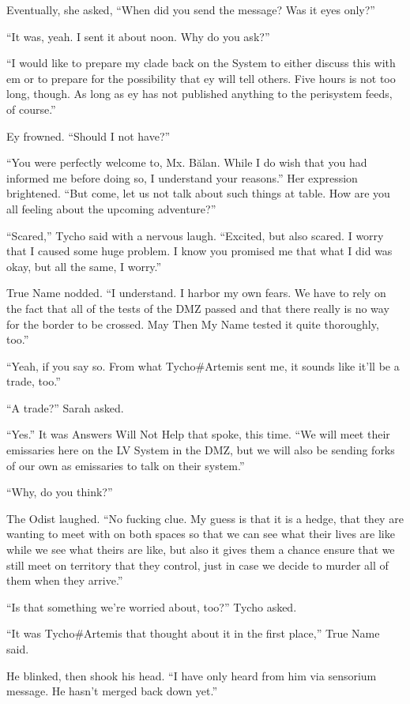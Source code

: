 Eventually, she asked, ``When did you send the message? Was it eyes only?''

``It was, yeah. I sent it about noon. Why do you ask?''

``I would like to prepare my clade back on the System to either discuss this with em or to prepare for the possibility that ey will tell others. Five hours is not too long, though. As long as ey has not published anything to the perisystem feeds, of course.''

Ey frowned. ``Should I not have?''

``You were perfectly welcome to, Mx. Bălan. While I do wish that you had informed me before doing so, I understand your reasons.'' Her expression brightened. ``But come, let us not talk about such things at table. How are you all feeling about the upcoming adventure?''

``Scared,'' Tycho said with a nervous laugh. ``Excited, but also scared. I worry that I caused some huge problem. I know you promised me that what I did was okay, but all the same, I worry.''

True Name nodded. ``I understand. I harbor my own fears. We have to rely on the fact that all of the tests of the DMZ passed and that there really is no way for the border to be crossed. May Then My Name tested it quite thoroughly, too.''

``Yeah, if you say so. From what Tycho\#Artemis sent me, it sounds like it'll be a trade, too.''

``A trade?'' Sarah asked.

``Yes.'' It was Answers Will Not Help that spoke, this time. ``We will meet their emissaries here on the LV System in the DMZ, but we will also be sending forks of our own as emissaries to talk on their system.''

``Why, do you think?''

The Odist laughed. ``No fucking clue. My guess is that it is a hedge, that they are wanting to meet with on both spaces so that we can see what their lives are like while we see what theirs are like, but also it gives them a chance ensure that we still meet on territory that they control, just in case we decide to murder all of them when they arrive.''

``Is that something we're worried about, too?'' Tycho asked.

``It was Tycho\#Artemis that thought about it in the first place,'' True Name said.

He blinked, then shook his head. ``I have only heard from him via sensorium message. He hasn't merged back down yet.''

